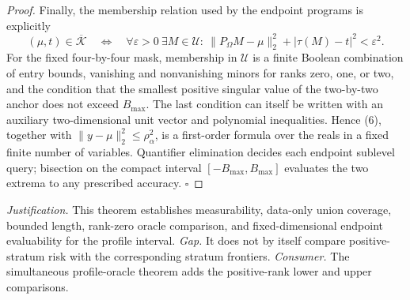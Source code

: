 \documentclass{article}
\begin{document}
\begin{proof}
Finally, the membership relation used by the endpoint programs is explicitly
\[
 (\mu,t)\in\overline{\mathcal K}
 \quad\Longleftrightarrow\quad
 \forall\varepsilon>0\ \exists M\in\mathcal U:\
 \lVert P_\Omega M-\mu\rVert_2^2+|\tau(M)-t|^2<\varepsilon^2.
\tag{6}
\]
For the fixed four-by-four mask, membership in \(\mathcal U\) is a finite Boolean combination of entry bounds, vanishing and nonvanishing minors for ranks zero, one, or two, and the condition that the smallest positive singular value of the two-by-two anchor does not exceed \(B_{\max}\).  The last condition can itself be written with an auxiliary two-dimensional unit vector and polynomial inequalities.  Hence (6), together with
\(\lVert y-\mu\rVert_2^2\leq\rho_\alpha^2\), is a first-order formula over the reals in a fixed finite number of variables.  Quantifier elimination decides each endpoint sublevel query; bisection on the compact interval \([-B_{\max},B_{\max}]\) evaluates the two extrema to any prescribed accuracy. \(\square\)
\end{proof}
\par\smallskip\noindent \textit{Justification.} This theorem establishes measurability, data-only union coverage, bounded length, rank-zero oracle comparison, and fixed-dimensional endpoint evaluability for the profile interval. \textit{Gap.} It does not by itself compare positive-stratum risk with the corresponding stratum frontiers. \textit{Consumer.} The simultaneous profile-oracle theorem adds the positive-rank lower and upper comparisons.
\end{document}
